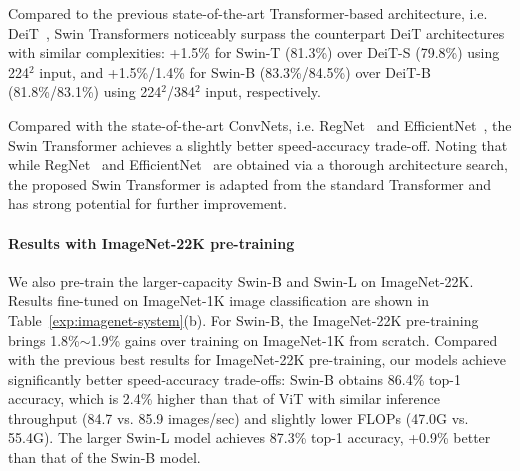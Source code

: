 \documentclass[10pt,twocolumn,letterpaper]{article}
\begin{document}
Compared to the previous state-of-the-art Transformer-based architecture, i.e. DeiT~\cite{touvron2020deit}, Swin Transformers noticeably surpass the counterpart DeiT architectures with similar complexities: +1.5\% for Swin-T (81.3\%) over DeiT-S (79.8\%) using 224$^2$ input, and +1.5\%/1.4\% for Swin-B (83.3\%/84.5\%) over DeiT-B (81.8\%/83.1\%) using 224$^2$/384$^2$ input, respectively.

Compared with the state-of-the-art ConvNets, i.e. RegNet~\cite{radosavovic2020regnet} and EfficientNet~\cite{tan2019efficientnet}, the Swin Transformer achieves a slightly better speed-accuracy trade-off. Noting that while RegNet~\cite{radosavovic2020regnet} and EfficientNet~\cite{tan2019efficientnet} are obtained via a thorough architecture search, the proposed Swin Transformer is adapted from the standard Transformer and has strong potential for further improvement.


\paragraph{Results with ImageNet-22K pre-training} We also pre-train the larger-capacity Swin-B and Swin-L on ImageNet-22K. Results fine-tuned on ImageNet-1K image classification are shown in Table~\ref{exp:imagenet-system}(b). For Swin-B, the ImageNet-22K pre-training brings 1.8\%$\sim$1.9\% gains over training on ImageNet-1K from scratch. Compared with the previous best results for ImageNet-22K pre-training, our models achieve significantly better speed-accuracy trade-offs: Swin-B obtains 86.4\% top-1 accuracy, which is 2.4\% higher than that of ViT with similar inference throughput (84.7 vs. 85.9 images/sec) and slightly lower FLOPs (47.0G vs. 55.4G). The larger Swin-L model achieves 87.3\% top-1 accuracy, +0.9\% better than that of the Swin-B model. 
\end{document}
